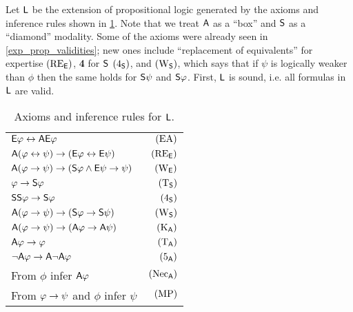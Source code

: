 Let $\sL$ be the extension of propositional logic generated by the axioms and
inference rules shown in \cref{exp_tab_axioms_general_case}.\footnotemark{} Note that we treat
$\A$ as a ``box'' and $\S$ as a ``diamond'' modality. Some of the axioms were
already seen in \cref{exp_prop_validities}; new ones include ``replacement of
equivalents'' for expertise $\reE$, \textbf{4} for $\S$ $\foursoundness$,
and $\weakeningS$, which says that if $\psi$ is logically weaker than $\phi$
then the same holds for $\S\psi$ and $\S\phi$. First, $\sL$ is sound, i.e. all
formulas in $\sL$ are valid.


\begin{table}
    \centering
    \caption{Axioms and inference rules for $\sL$.}
    \begin{tabular}{lr}
        \toprule
         $\E\phi \liff \A\E\phi$
             & $\EA$ \\
         $\A(\phi \liff \psi) \limplies (\E\phi \liff \E\psi)$
             & $\reE$ \\
         $\A(\phi \limplies \psi) \limplies (\S\phi \land \E\psi \limplies \psi)$
             & $\weakeningE$ \\
         \midrule
         $\phi \limplies \S\phi$
             & $\Tsoundness$ \\
         $\S\S\phi \limplies \S\phi$
             & $\foursoundness$ \\
         $\A(\phi \limplies \psi) \limplies (\S\phi \limplies \S\psi)$
             & $\weakeningS$ \\
         \midrule
         $\A(\phi \limplies \psi) \limplies (\A\phi \limplies \A\psi)$
             & $\Kuniv$ \\
         $\A\phi \limplies \phi$
             & $\Tuniv$ \\
         $\neg\A\phi \limplies \A\neg\A\phi$
             & $\fiveuniv$ \\
         \midrule
         From $\phi$ infer $\A\phi$
             & $\necuniv$ \\
         From $\phi \limplies \psi$ and $\phi$ infer $\psi$
             & $\modpon$ \\
        \bottomrule
    \end{tabular}
    \label{exp_tab_axioms_general_case}
\end{table}

